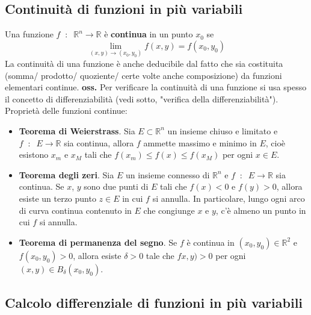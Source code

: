 \subsection{Continuità di funzioni in più variabili}
Una funzione $f \;\;:\;\; \mathbb{R}^n \rightarrow  \mathbb{R}$ è \textbf{continua} in un punto $x_0$ se 
\[
    \lim_{(x,y)\rightarrow (x_0,y_0)} f(x,y) = f(x_0,y_0)
\]
La continuità di una funzione è anche deducibile dal fatto che sia costituita (somma/ prodotto/ quoziente/ certe volte anche composizione) da funzioni elementari continue.
\newline
\newline
\textbf{oss.} Per verificare la continuità di una funzione si usa spesso il concetto di differenziabilità (vedi sotto, "verifica della differenziabilità").
\newline
\newline
Proprietà delle funzioni continue:
\begin{itemize}
    \item \textbf{Teorema di Weierstrass}. Sia $E \subset \mathbb{R}^n$ un insieme chiuso e limitato e $f \;\;:\;\; E \rightarrow \mathbb{R}$ sia continua, allora $f$ ammette massimo e minimo in $E$, cioè esistono $x_m$ e $x_M$ tali che $f(x_m) \leq f(x) \leq f(x_M)$ per ogni $x \in E$.
    \item \textbf{Teorema degli zeri}. Sia $E$ un insieme connesso di $\mathbb{R}^n$ e $f \;\;:\;\; E \rightarrow \mathbb{R}$ sia continua. Se $x$, $y$ sono due punti di $E$ tali che $ f(x) < 0$ e $f(y) > 0$, allora esiste un terzo punto $z \in E$ in cui $f$ si annulla. In particolare, lungo ogni arco di curva continua contenuto in $E$ che congiunge $x$ e $y$, c'è almeno un punto in cui $f$ si annulla.
    \item \textbf{Teorema di permanenza del segno}. Se $f$ è continua in $(x_0, y_0) \in \mathbb{R}^2$ e $f(x_0, y_0) > 0$, allora esiste $\delta>0$ tale che $fx,y) > 0$ per ogni $(x,y) \in B_\delta(x_0,y_0)$.
\end{itemize}
\subsection{Calcolo differenziale di funzioni in più variabili}
